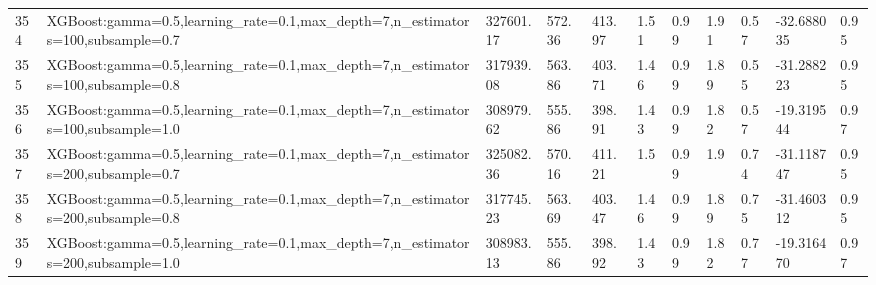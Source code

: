 \begin{longtable}{C{0.8cm} L{2cm} C{1.15cm} C{1.15cm} C{1.15cm} C{1.15cm} C{0.85cm} C{1.25cm} C{1.2cm} C{1.5cm} C{1.0cm}}
354 & XGBoost:\newline gamma=0.5,\newline learning\_rate=0.1,\newline max\_depth=7,\newline n\_estimators=100,\newline subsample=0.7 & 327601.17 & 572.36 & 413.97 & 1.51 & 0.99 & 1.91 & 0.57 & -32.688035 & 0.95 \\
355 & XGBoost:\newline gamma=0.5,\newline learning\_rate=0.1,\newline max\_depth=7,\newline n\_estimators=100,\newline subsample=0.8 & 317939.08 & 563.86 & 403.71 & 1.46 & 0.99 & 1.89 & 0.55 & -31.288223 & 0.95 \\
356 & XGBoost:\newline gamma=0.5,\newline learning\_rate=0.1,\newline max\_depth=7,\newline n\_estimators=100,\newline subsample=1.0 & 308979.62 & 555.86 & 398.91 & 1.43 & 0.99 & 1.82 & 0.57 & -19.319544 & 0.97 \\
357 & XGBoost:\newline gamma=0.5,\newline learning\_rate=0.1,\newline max\_depth=7,\newline n\_estimators=200,\newline subsample=0.7 & 325082.36 & 570.16 & 411.21 & 1.5 & 0.99 & 1.9 & 0.74 & -31.118747 & 0.95 \\
358 & XGBoost:\newline gamma=0.5,\newline learning\_rate=0.1,\newline max\_depth=7,\newline n\_estimators=200,\newline subsample=0.8 & 317745.23 & 563.69 & 403.47 & 1.46 & 0.99 & 1.89 & 0.75 & -31.460312 & 0.95 \\
359 & XGBoost:\newline gamma=0.5,\newline learning\_rate=0.1,\newline max\_depth=7,\newline n\_estimators=200,\newline subsample=1.0 & 308983.13 & 555.86 & 398.92 & 1.43 & 0.99 & 1.82 & 0.77 & -19.316470 & 0.97 \\

\end{longtable}
